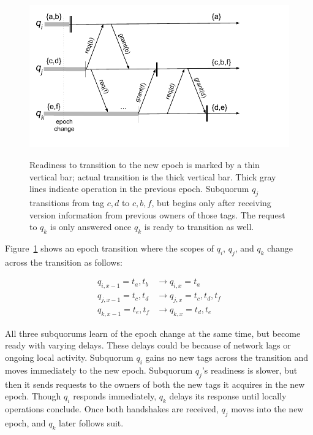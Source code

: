 \begin{figure}
    \begin{center}
        \includegraphics[width=5in]{figures/ch03_namespace_handoff.pdf}
    \end{center}
    \renewcommand{\baselinestretch}{1}
    \small\normalsize

    \begin{quote}
        \caption[Epoch Transition: Fuzzy Handshakes]{Readiness to transition to the new epoch is marked by a thin vertical bar; actual transition is the thick vertical bar.  Thick gray lines indicate operation in the previous epoch.  Subquorum $q_j$ transitions from tag ${c,d}$ to ${c,b,f}$, but begins only after receiving version information from previous owners of those tags.  The request to $q_k$ is only answered once $q_k$ is ready to transition as well.}
        \label{fig:ch03_namespace_handoff}
    \end{quote}
\end{figure}
\renewcommand{\baselinestretch}{2}
\small\normalsize

Figure~\ref{fig:ch03_namespace_handoff} shows an epoch transition where the scopes of $q_i$, $q_j$, and $q_k$ change across the transition as follows:


\renewcommand{\baselinestretch}{1}
\begin{eqnarray}
    q_{i,x-1} = t_a, t_b  &\longrightarrow q_{i,x} = t_a\\
    q_{j,x-1} = t_c, t_d  &\longrightarrow q_{j,x} = t_c,t_d,t_f\\
    q_{k,x-1} = t_e, t_f  &\longrightarrow q_{k,x} = t_d,t_e
\end{eqnarray}
\renewcommand{\baselinestretch}{2}

All three subquorums learn of the epoch change at the same time, but become ready with varying delays.
These delays could be because of network lags or ongoing local activity.
Subquorum $q_i$ gains no new tags across the transition and moves immediately to the new epoch.
Subquorum $q_j$'s readiness is slower, but then it sends requests to the owners of both the new tags it acquires in the new epoch.
Though $q_i$ responds immediately, $q_k$ delays its response until locally operations conclude.
Once both handshakes are received, $q_j$ moves into the new epoch, and $q_k$ later follows suit.

